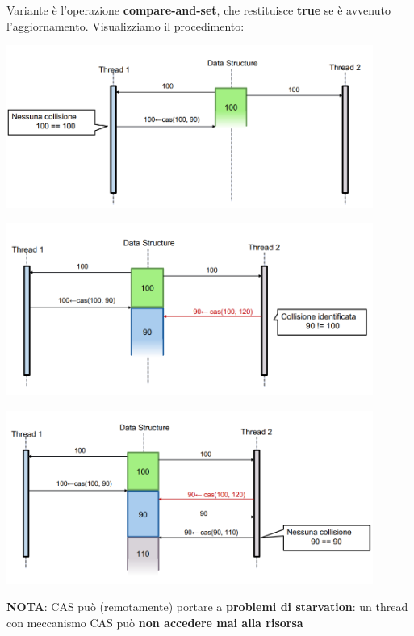 \documentclass[12pt]{article}
\begin{document}
Variante è l'operazione \textbf{compare-and-set}, che restituisce \textbf{true} se è avvenuto l'aggiornamento. Visualizziamo il procedimento:
\begin{center}
    \includegraphics[width = 0.90\textwidth]{Images/89.png}
\end{center}
\begin{center}
    \includegraphics[width = 0.90\textwidth]{Images/90.png}
\end{center}
\begin{center}
    \includegraphics[width = 0.90\textwidth]{Images/91.png}
\end{center}
\textbf{NOTA}: CAS può (remotamente) portare a \textbf{problemi di starvation}: un thread con meccanismo CAS può \textbf{non accedere mai alla risorsa}
\end{document}
